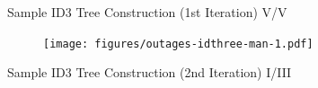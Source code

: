 \documentclass[document.tex]{subfiles}
\begin{document}
    \begin{frame}{Sample ID3 Tree Construction (1st Iteration) V/V}
        \begin{figure}
            \texttt{[image: figures/outages-idthree-man-1.pdf]}
        \end{figure}
    \end{frame}
    
    \begin{frame}{Sample ID3 Tree Construction (2nd Iteration) I/III}
        \begin{columns}
            \begin{column}{0.4\textwidth}
                \begin{table}
                    \caption*{\footnotesize Sample $S$ \normalsize}
                    \vspace*{-2mm}
                \end{table}
                \vspace*{-6mm}
                \begin{table}
                    \caption*{\footnotesize Attribute $A=TEMPERATURE$, Sample $S_H$ \normalsize}
                    \vspace*{-2mm}
\end{table}
\end{column}
\end{columns}
\end{frame}
\end{document}
